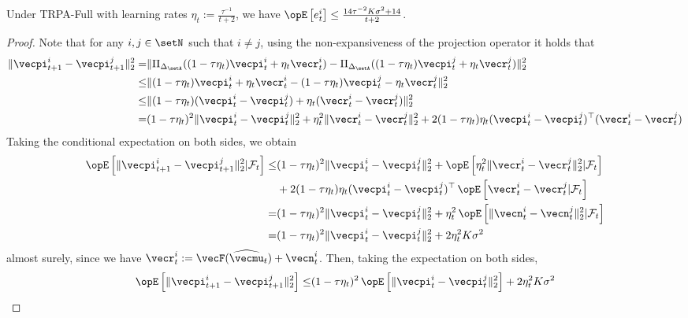 \begin{lemma}\label{lemma:policy_variations_bound_trpa_full}
    Under TRPA-Full with learning rates $\eta_t :=\frac{\tau^{-1}}{t+2}$, we have $\Exop\left[e_t^i\right] \leq \frac{14 \tau^{-2} K\sigma^2 + 14}{t+2}$.
\end{lemma}
\begin{proof}
Note that for any $i,j\in\setN$ such that $i\neq j$, using the non-expansiveness of the projection operator it holds that
\begin{align*}
    \| \vecpi^i_{t+1} - \vecpi^j_{t+1} \|_2^2 = &  \| \Pi_{\Delta_\setA}((1 - \tau \eta_t) \vecpi^i_t + \eta_t \vecr_t^i) - \Pi_{\Delta_\setA}((1 - \tau \eta_t) \vecpi^j_t + \eta_t \vecr_t^j) \|_2^2 \\
    \leq & \| (1 - \tau \eta_t) \vecpi^i_t + \eta_t \vecr_t^i - (1 - \tau \eta_t) \vecpi^j_t - \eta_t \vecr_t^j \|_2^2 \\
    \leq & \| (1 - \tau \eta_t) (\vecpi^i_t - \vecpi^j_t) + \eta_t (\vecr_t^i - \vecr_t^j) \|_2^2 \\
    = & (1 - \tau \eta_t)^2 \| \vecpi^i_t - \vecpi^j_t \|_2^2 + \eta_t^2 \|  \vecr_t^i - \vecr_t^j \|_2^2 + 2 (1 - \tau \eta_t) \eta_t (\vecpi^i_t - \vecpi^j_t) ^ \top ( \vecr_t^i - \vecr_t^j )
\end{align*}
Taking the conditional expectation on both sides, we obtain
\begin{align*}
    \Exop \left[ \| \vecpi^i_{t+1} - \vecpi^j_{t+1} \|_2^2 | \mathcal{F}_t \right] \leq & (1 - \tau \eta_t)^2 \| \vecpi^i_t - \vecpi^j_t \|_2^2 + \Exop \left[ \eta_t^2 \|  \vecr_t^i - \vecr_t^j \|_2^2 | \mathcal{F}_t \right] \\
        &+ 2 (1 - \tau \eta_t) \eta_t (\vecpi^i_t - \vecpi^j_t) ^ \top \Exop\left[\vecr_t^i - \vecr_t^j | \mathcal{F}_t \right] \\
    = & (1 - \tau \eta_t)^2 \|  \vecpi^i_t - \vecpi^j_t \|_2^2 + \eta_t^2 \Exop \left[\|\vecn^i_t - \vecn^j_t\|_2^2 | \mathcal{F}_t \right] \\
    = & (1 - \tau \eta_t)^2 \|  \vecpi^i_t - \vecpi^j_t \|_2^2 + 2\eta_t^2 K \sigma^2
\end{align*}
almost surely, since we have $\vecr_t^i := \vecF(\widehat{\vecmu}_t) + \vecn^i_t$.
Then, taking the expectation on both sides, 
\begin{align*}
    \Exop \left[ \| \vecpi^i_{t+1} - \vecpi^j_{t+1} \|_2^2 \right] \leq &(1 - \tau \eta_t)^2 \Exop\left[\|  \vecpi^i_t - \vecpi^j_t \|_2^2\right] + 2\eta_t^2 K\sigma^2 \\

\end{align*}
\end{proof}
